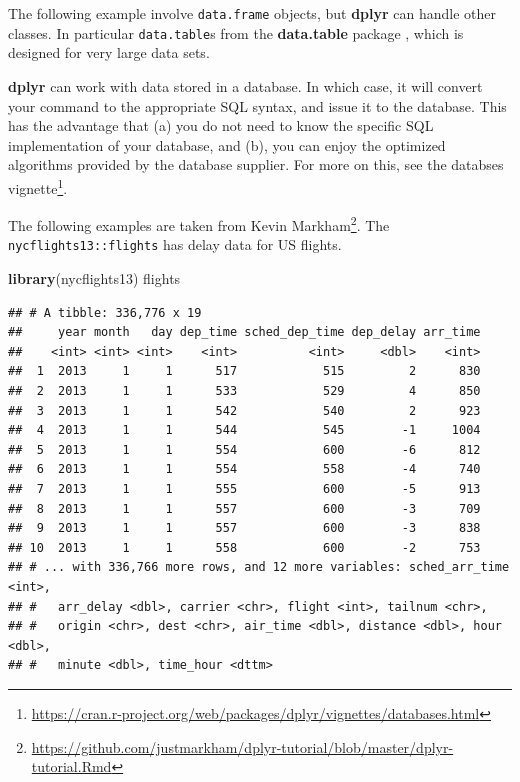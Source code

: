 \documentclass[]{book}
\newenvironment{Shaded}{\begin{snugshade}}{\end{snugshade}}
\newcommand{\KeywordTok}[1]{\textcolor[rgb]{0.13,0.29,0.53}{\textbf{#1}}}
\newcommand{\NormalTok}[1]{#1}
\renewcommand{\href}[2]{#2\footnote{\url{#1}}}
\theoremstyle{definition}
\theoremstyle{definition}
\theoremstyle{definition}
\theoremstyle{remark}
\begin{document}
The following example involve \texttt{data.frame} objects, but \textbf{dplyr} can handle other classes.
In particular \texttt{data.table}s from the \textbf{data.table} package \citep{datatable}, which is designed for very large data sets.

\textbf{dplyr} can work with data stored in a database.
In which case, it will convert your command to the appropriate SQL syntax, and issue it to the database.
This has the advantage that (a) you do not need to know the specific SQL implementation of your database, and (b), you can enjoy the optimized algorithms provided by the database supplier.
For more on this, see the \href{https://cran.r-project.org/web/packages/dplyr/vignettes/databases.html}{databses vignette}.

The following examples are taken from \href{https://github.com/justmarkham/dplyr-tutorial/blob/master/dplyr-tutorial.Rmd}{Kevin Markham}.
The \texttt{nycflights13::flights} has delay data for US flights.

\begin{Shaded}
\begin{Highlighting}[]
\KeywordTok{library}\NormalTok{(nycflights13)}
\NormalTok{flights}
\end{Highlighting}
\end{Shaded}

\begin{verbatim}
## # A tibble: 336,776 x 19
##     year month   day dep_time sched_dep_time dep_delay arr_time
##    <int> <int> <int>    <int>          <int>     <dbl>    <int>
##  1  2013     1     1      517            515         2      830
##  2  2013     1     1      533            529         4      850
##  3  2013     1     1      542            540         2      923
##  4  2013     1     1      544            545        -1     1004
##  5  2013     1     1      554            600        -6      812
##  6  2013     1     1      554            558        -4      740
##  7  2013     1     1      555            600        -5      913
##  8  2013     1     1      557            600        -3      709
##  9  2013     1     1      557            600        -3      838
## 10  2013     1     1      558            600        -2      753
## # ... with 336,766 more rows, and 12 more variables: sched_arr_time <int>,
## #   arr_delay <dbl>, carrier <chr>, flight <int>, tailnum <chr>,
## #   origin <chr>, dest <chr>, air_time <dbl>, distance <dbl>, hour <dbl>,
## #   minute <dbl>, time_hour <dttm>
\end{verbatim}
\end{document}

